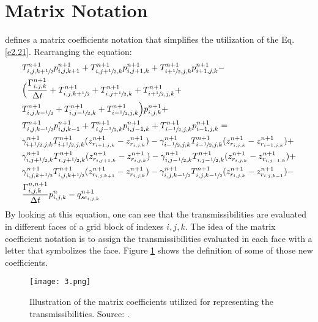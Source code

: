 \section{Matrix Notation}

\cite{Ertekin2001} defines a matrix coefficients notation that simplifies the utilization of the Eq.\ref{e2.21}. Rearranging the equation:
\begin{align}\nonumber
\label{rearranjo}
& T^{n+1}_{i,j,k+\sfrac{1}{2}} p^{n+1}_{i,j,k+1} + T^{n+1}_{i,j+\sfrac{1}{2},k} p^{n+1}_{i,j+1,k} + T^{n+1}_{i+\sfrac{1}{2},j,k} p^{n+1}_{i+1,j,k} \nonumber -\\ &
\Big( \frac{\Gamma_{i,j,k}^{n+1}}{\Delta t} + T^{n+1}_{i,j,k+\sfrac{1}{2}} + T^{n+1}_{i,j+\sfrac{1}{2},k} + T^{n+1}_{i+\sfrac{1}{2},j,k} \nonumber +\\ &
T^{n+1}_{i,j,k-\sfrac{1}{2}} + T^{n+1}_{i,j-\sfrac{1}{2},k} + T^{n+1}_{i-\sfrac{1}{2},j,k} \Big) p^{n+1}_{i,j,k} \nonumber +\\ &
T^{n+1}_{i,j,k-\sfrac{1}{2}} p^{n+1}_{i,j,k-1} + T^{n+1}_{i,j-\sfrac{1}{2},k} p^{n+1}_{i,j-1,k} + T^{n+1}_{i-\sfrac{1}{2},j,k} p^{n+1}_{i-1,j,k} 	\nonumber =\\ &
\gamma^{n+1}_{i+\sfrac{1}{2},j,k} T^{n+1}_{i+\sfrac{1}{2},j,k}(z^{n+1}_{r_{i+1,j,k}}-z^{n+1}_{r_{i,j,k}}) - \gamma^{n+1}_{i-\sfrac{1}{2},j,k} T^{n+1}_{i-\sfrac{1}{2},j,k}(z^{n+1}_{r_{i,j,k}}-z^{n+1}_{r_{i-1,j,k}}) \nonumber +\\ &
\gamma^{n+1}_{i,j+\sfrac{1}{2},k} T^{n+1}_{i,j+\sfrac{1}{2},k}(z^{n+1}_{r_{i,j+1,k}}-z^{n+1}_{r_{i,j,k}}) - \gamma^{n+1}_{i,j-\sfrac{1}{2},k} T^{n+1}_{i,j-\sfrac{1}{2},k}(z^{n+1}_{r_{i,j,k}}-z^{n+1}_{r_{i,j-1,k}}) \nonumber +\\ &
\gamma^{n+1}_{i,j,k+\sfrac{1}{2}} T^{n+1}_{i,j,k+\sfrac{1}{2}}(z^{n+1}_{r_{i,j,k+1}}-z^{n+1}_{r_{i,j,k}}) - \gamma^{n+1}_{i,j,k-\sfrac{1}{2}} T^{n+1}_{i,j,k-\sfrac{1}{2}}(z^{n+1}_{r_{i,j,k}}-z^{n+1}_{r_{i,j,k-1}})\nonumber -\\ &
\frac{\Gamma_{i,j,k}^{n,n+1}}{\Delta t} p_{i,j,k}^n - q^{n+1}_{sc_{i,j,k}}
\end{align}
By looking at this equation, one can see that the transmissibilities are evaluated in different faces of a grid block of indexes $i,j,k$. The idea of the matrix coefficient notation is to assign the transmissibilities evaluated in each face with a letter that symbolizes the face. Figure \ref{fig:3} shows the definition of some of those new coefficients.
 \begin{figure}[h]
 	\centering
 	\texttt{[image: 3.png]}\\
 	\caption{Illustration of the matrix coefficients utilized for representing the transmissibilities. Source: \cite{Ertekin2001}.}
 	\label{fig:3}
 \end{figure}
